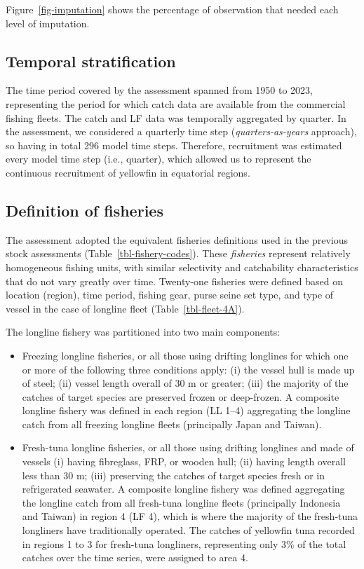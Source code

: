 \documentclass[
]{scrartcl}
\begin{document}
Figure~\ref{fig-imputation} shows the percentage of observation that
needed each level of imputation.

\subsection{Temporal stratification}\label{temporal-stratification}

The time period covered by the assessment spanned from 1950 to 2023,
representing the period for which catch data are available from the
commercial fishing fleets. The catch and LF data was temporally
aggregated by quarter. In the assessment, we considered a quarterly time
step (\emph{quarters-as-years} approach), so having in total 296 model
time steps. Therefore, recruitment was estimated every model time step
(i.e., quarter), which allowed us to represent the continuous
recruitment of yellowfin in equatorial regions.

\subsection{Definition of fisheries}\label{definition-of-fisheries}

The assessment adopted the equivalent fisheries definitions used in the
previous stock assessments (Table~\ref{tbl-fishery-codes}). These
\emph{fisheries} represent relatively homogeneous fishing units, with
similar selectivity and catchability characteristics that do not vary
greatly over time. Twenty-one fisheries were defined based on location
(region), time period, fishing gear, purse seine set type, and type of
vessel in the case of longline fleet (Table~\ref{tbl-fleet-4A}).

The longline fishery was partitioned into two main components:

\begin{itemize}
\item
  Freezing longline fisheries, or all those using drifting longlines for
  which one or more of the following three conditions apply: (i) the
  vessel hull is made up of steel; (ii) vessel length overall of 30 m or
  greater; (iii) the majority of the catches of target species are
  preserved frozen or deep-frozen. A composite longline fishery was
  defined in each region (LL 1--4) aggregating the longline catch from
  all freezing longline fleets (principally Japan and Taiwan).
\item
  Fresh-tuna longline fisheries, or all those using drifting longlines
  and made of vessels (i) having fibreglass, FRP, or wooden hull; (ii)
  having length overall less than 30 m; (iii) preserving the catches of
  target species fresh or in refrigerated seawater. A composite longline
  fishery was defined aggregating the longline catch from all fresh-tuna
  longline fleets (principally Indonesia and Taiwan) in region 4 (LF 4),
  which is where the majority of the fresh-tuna longliners have
  traditionally operated. The catches of yellowfin tuna recorded in
  regions 1 to 3 for fresh-tuna longliners, representing only 3\% of the
  total catches over the time series, were assigned to area 4.
\end{itemize}
\end{document}
